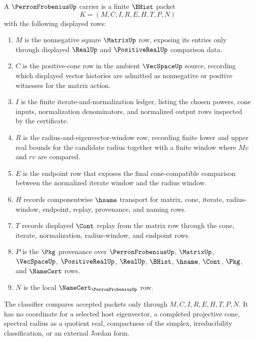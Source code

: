 \begin{definition}
\label{def:perron-frobenius-carrier}
A $\PerronFrobeniusUp$ carrier is a finite $\BHist$ packet
$$
K=(M,C,I,R,E,H,T,P,N)
$$
with the following displayed rows:
\begin{enumerate}
\item $M$ is the nonnegative square $\MatrixUp$ row, exposing its entries only through displayed $\RealUp$ and $\PositiveRealUp$ comparison data.
\item $C$ is the positive-cone row in the ambient $\VecSpaceUp$ source, recording which displayed vector histories are admitted as nonnegative or positive witnesses for the matrix action.
\item $I$ is the finite iterate-and-normalization ledger, listing the chosen powers, cone inputs, normalization denominators, and normalized output rows inspected by the certificate.
\item $R$ is the radius-and-eigenvector-window row, recording finite lower and upper real bounds for the candidate radius together with a finite window where $Mv$ and $rv$ are compared.
\item $E$ is the endpoint row that exposes the final cone-compatible comparison between the normalized iterate window and the radius window.
\item $H$ records componentwise $\hsame$ transport for matrix, cone, iterate, radius-window, endpoint, replay, provenance, and naming rows.
\item $T$ records displayed $\Cont$ replay from the matrix row through the cone, iterate, normalization, radius-window, and endpoint rows.
\item $P$ is the $\Pkg$ provenance over $\PerronFrobeniusUp$, $\MatrixUp$, $\VecSpaceUp$, $\PositiveRealUp$, $\RealUp$, $\BHist$, $\hsame$, $\Cont$, $\Pkg$, and $\NameCert$ rows.
\item $N$ is the local $\NameCert_{\PerronFrobeniusUp}$ row.
\end{enumerate}
The classifier compares accepted packets only through $M,C,I,R,E,H,T,P,N$. It has no coordinate for a selected host eigenvector, a completed projective cone, spectral radius as a quotient real, compactness of the simplex, irreducibility classification, or an external Jordan form.
\end{definition}

